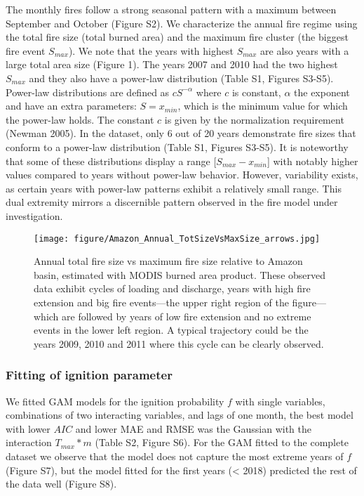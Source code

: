 \documentclass[
]{article}
\begin{document}
The monthly fires follow a strong seasonal pattern with a maximum
between September and October (Figure S2). We characterize the annual
fire regime using the total fire size (total burned area) and the
maximum fire cluster (the biggest fire event \(S_{max}\)). We note that
the years with highest \(S_{max}\) are also years with a large total
area size (Figure 1). The years 2007 and 2010 had the two highest
\(S_{max}\) and they also have a power-law distribution (Table S1,
Figures S3-S5). Power-law distributions are defined as \(c S^{-\alpha}\)
where \(c\) is constant, \(\alpha\) the exponent and have an extra
parameters: \(S=x_{min}\), which is the minimum value for which the
power-law holds. The constant \(c\) is given by the normalization
requirement (Newman 2005). In the dataset, only 6 out of 20 years
demonstrate fire sizes that conform to a power-law distribution (Table
S1, Figures S3-S5). It is noteworthy that some of these distributions
display a range {[}\(S_{max} - x_{min}\){]} with notably higher values
compared to years without power-law behavior. However, variability
exists, as certain years with power-law patterns exhibit a relatively
small range. This dual extremity mirrors a discernible pattern observed
in the fire model under investigation.

\begin{figure}
\centering
\texttt{[image: figure/Amazon\_Annual\_TotSizeVsMaxSize\_arrows.jpg]}
\caption{Annual total fire size vs maximum fire size relative to Amazon
basin, estimated with MODIS burned area product. These observed data
exhibit cycles of loading and discharge, years with high fire extension
and big fire events---the upper right region of the figure---which are
followed by years of low fire extension and no extreme events in the
lower left region. A typical trajectory could be the years 2009, 2010
and 2011 where this cycle can be clearly observed.}
\end{figure}

\subsubsection{Fitting of ignition
parameter}\label{fitting-of-ignition-parameter-1}

We fitted GAM models for the ignition probability \(f\) with single
variables, combinations of two interacting variables, and lags of one
month, the best model with lower \(AIC\) and lower MAE and RMSE was the
Gaussian with the interaction \(T_{max} * m\) (Table S2, Figure S6). For
the GAM fitted to the complete dataset we observe that the model does
not capture the most extreme years of \(f\) (Figure S7), but the model
fitted for the first years (\textless{} 2018) predicted the rest of the
data well (Figure S8).
\end{document}

